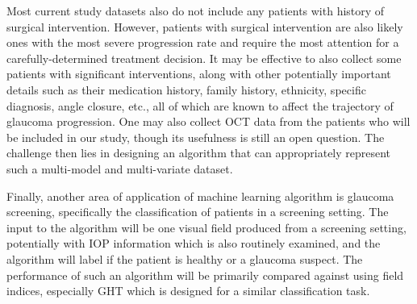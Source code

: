 Most current study datasets also do not include any patients with history of surgical intervention. However, patients with surgical intervention are also likely ones with the most severe progression rate and require the most attention for a carefully-determined treatment decision. It may be effective to also collect some patients with significant interventions, along with other potentially important details such as their medication history, family history, ethnicity, specific diagnosis, angle closure, etc., all of which are known to affect the trajectory of glaucoma progression. One may also collect \ac{OCT} data from the patients who will be included in our study, though its usefulness is still an open question. The challenge then lies in designing an algorithm that can appropriately represent such a multi-model and multi-variate dataset. 

Finally, another area of application of machine learning algorithm is glaucoma screening, specifically the classification of patients in a screening setting. The input to the algorithm will be one visual field produced from a screening setting, potentially with \ac{IOP} information which is also routinely examined, and the algorithm will label if the patient is healthy or a glaucoma suspect. The performance of such an algorithm will be primarily compared against using field indices, especially \ac{GHT} which is designed for a similar classification task. 
